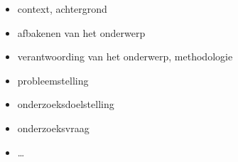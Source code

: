 











\begin{itemize}
  \item context, achtergrond
  \item afbakenen van het onderwerp
  \item verantwoording van het onderwerp, methodologie
  \item probleemstelling
  \item onderzoeksdoelstelling
  \item onderzoeksvraag
  \item \ldots
\end{itemize} 

